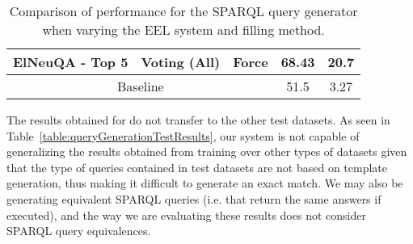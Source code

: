 \begin{table}[h!]
\begin{tabular}{|c|cc|cc|}
    ElNeuQA - Top 5                  & Voting (All)                                                                                                    & Force                                                                               & 68.43                                    & 20.7                   \\ \hline
    \multicolumn{3}{|c|}{Baseline}                                                                                                                                                                                                           & 51.5                                     & 3.27                   \\ \hline
    \end{tabular}%
    \caption{Comparison of performance for the SPARQL query generator when varying the EEL system and filling method.}
    \label{table:queryGenerationResults}
\end{table}

The results obtained for \LCQuADtwo{} do not transfer to the other test datasets. As seen in 
Table~\ref{table:queryGenerationTestResults}, our system is not capable of generalizing the results 
obtained from training over other types of datasets given that the type of queries contained in 
test datasets are not based on template generation, thus making it difficult to generate an exact 
match. We may also be generating equivalent SPARQL queries (i.e. that return the same answers if 
executed), and the way we are evaluating these results does not consider SPARQL query equivalences.

